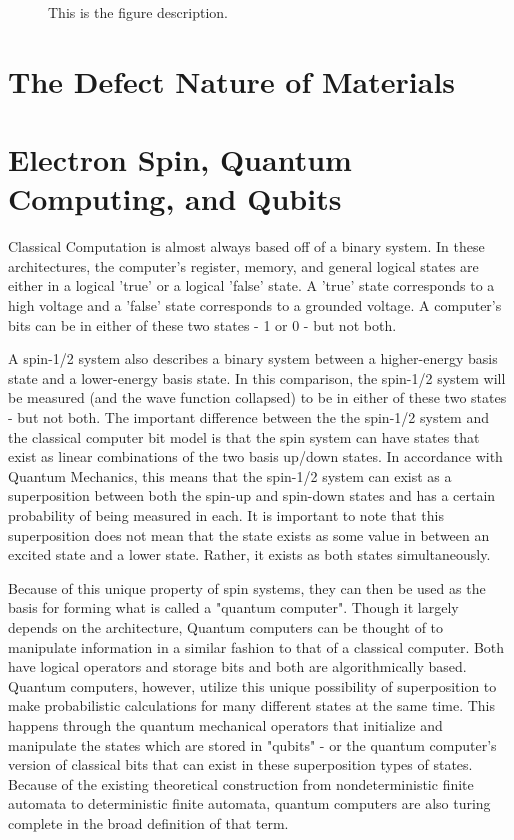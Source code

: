 \documentclass[oneside, astronomy, noacknowlegments]{BYUPhys}
\begin{document}
\begin{figure}
    \caption[Zeeman effect and resonant conditions in matter]{\label{fig:Zeeman}
     This is the figure description.}
\end{figure}

\section{The Defect Nature of Materials}

\section{Electron Spin, Quantum Computing, and Qubits}

Classical Computation is almost always based off of a binary system. In these architectures, the computer's register, memory, and general logical states are either in a logical 'true' or a logical 'false' state. A 'true' state corresponds to a high voltage and a 'false' state corresponds to a grounded voltage. A computer's bits can be in either of these two states - 1 or 0 - but not both.

A spin-1/2 system also describes a binary system between a higher-energy basis state and a lower-energy basis state. In this comparison, the spin-1/2 system will be measured (and the wave function collapsed) to be in either of these two states - but not both. The important difference between the the spin-1/2 system and the classical computer bit model is that the spin system can have states that exist as linear combinations of the two basis up/down states. In accordance with Quantum Mechanics, this means that the spin-1/2 system can exist as a superposition between both the spin-up and spin-down states and has a certain probability of being measured in each. It is important to note that this superposition does not mean that the state exists as some value in between an excited state and a lower state. Rather, it exists as both states simultaneously.

Because of this unique property of spin systems, they can then be used as the basis for forming what is called a "quantum computer". Though it largely depends on the architecture, Quantum computers can be thought of to manipulate information in a similar fashion to that of a classical computer. Both have logical operators and storage bits and both are algorithmically based. Quantum computers, however, utilize this unique possibility of superposition to make probabilistic calculations for many different states at the same time. This happens through the quantum mechanical operators that initialize and manipulate the states which are stored in "qubits" - or the quantum computer's version of classical bits that can exist in these superposition types of states. Because of the existing theoretical construction from nondeterministic finite automata to deterministic finite automata, quantum computers are also turing complete in the broad definition of that term.
\end{document}
